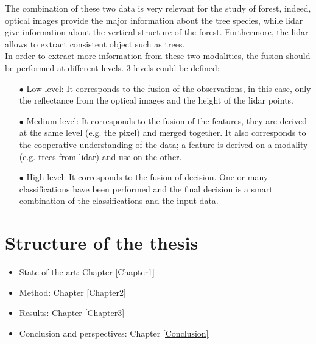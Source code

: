 The combination of these two data is very relevant for the study of forest, indeed, optical images provide the major information about the tree species, while lidar give information about the vertical structure of the forest. Furthermore, the lidar allows to extract consistent object such as trees. \\

In order to extract more information from these two modalities, the fusion should be performed at different levels. 3 levels could be defined:
\begin{itemize}
\item[$\bullet$] Low level: It corresponds to the fusion of the observations, in this case, only the reflectance from the optical images and the height of the lidar points.
\item[$\bullet$] Medium level: It corresponds to the fusion of the features, they are derived at the same level (e.g. the pixel) and merged together. It also corresponds to the cooperative understanding of the data; a feature is derived on a modality (e.g. trees from lidar) and use on the other.
\item[$\bullet$] High level: It corresponds to the fusion of decision. One or many classifications have been performed and the final decision is a smart combination of the classifications and the input data.
\end{itemize}

\section{Structure of the thesis}

\begin{itemize}
\item State of the art: Chapter \ref{Chapter1}
\item Method: Chapter \ref{Chapter2}
\item Results: Chapter \ref{Chapter3}
\item Conclusion and perspectives: Chapter \ref{Conclusion}
\end{itemize}

\stopcontents[chapters]
